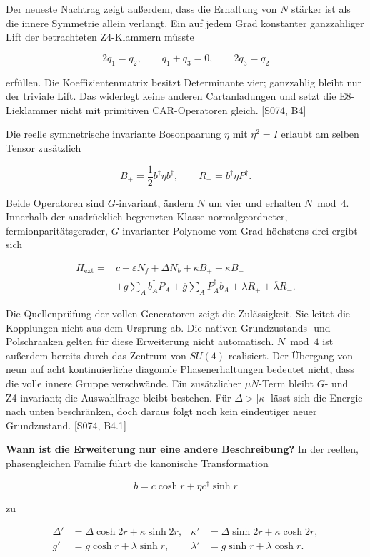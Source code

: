 Der neueste Nachtrag zeigt außerdem, dass die Erhaltung von \(N\)
stärker ist als die innere Symmetrie allein verlangt. Ein auf jedem Grad
konstanter ganzzahliger Lift der betrachteten Z4-Klammern müsste

\[2q_1=q_2,\qquad q_1+q_3=0,\qquad2q_3=q_2\]

erfüllen. Die Koeffizientenmatrix besitzt Determinante vier; ganzzahlig
bleibt nur der triviale Lift. Das widerlegt keine anderen Cartanladungen
und setzt die E8-Lieklammer nicht mit primitiven CAR-Operatoren gleich.
{[}S074, B4{]}

Die reelle symmetrische invariante Bosonpaarung \(\eta\) mit
\(\eta^2=I\) erlaubt am selben Tensor zusätzlich

\[B_+=\frac12b^\dagger\eta b^\dagger,\qquad
R_+=b^\dagger\eta P^\dagger.\]

Beide Operatoren sind \(G\)-invariant, ändern \(N\) um vier und erhalten
\(N\bmod4\). Innerhalb der ausdrücklich begrenzten Klasse
normalgeordneter, fermionparitätsgerader, \(G\)-invarianter Polynome vom
Grad höchstens drei ergibt sich

\[\begin{aligned}
H_{\mathrm{ext}}={}&c+\varepsilon N_f+\Delta N_b
+\kappa B_++\overline\kappa B_-\\
&+g\sum_A b_A^\dagger P_A
+\overline g\sum_A P_A^\dagger b_A
+\lambda R_++\overline\lambda R_-.
\end{aligned}\]

Die Quellenprüfung der vollen Generatoren zeigt die Zulässigkeit. Sie
leitet die Kopplungen nicht aus dem Ursprung ab. Die nativen
Grundzustands- und Polschranken gelten für diese Erweiterung nicht
automatisch. \(N\bmod4\) ist außerdem bereits durch das Zentrum von
\(SU(4)\) realisiert. Der Übergang von neun auf acht kontinuierliche
diagonale Phasenerhaltungen bedeutet nicht, dass die volle innere Gruppe
verschwände. Ein zusätzlicher \(\mu N\)-Term bleibt \(G\)- und
Z4-invariant; die Auswahlfrage bleibt bestehen. Für \(\Delta>|\kappa|\)
lässt sich die Energie nach unten beschränken, doch daraus folgt noch
kein eindeutiger neuer Grundzustand. {[}S074, B4.1{]}

\textbf{Wann ist die Erweiterung nur eine andere Beschreibung?} In der
reellen, phasengleichen Familie führt die kanonische Transformation

\[b=c\cosh r+\eta c^\dagger\sinh r\]

zu

\[\begin{aligned}
\Delta'&=\Delta\cosh2r+\kappa\sinh2r,&
\kappa'&=\Delta\sinh2r+\kappa\cosh2r,\\
g'&=g\cosh r+\lambda\sinh r,&
\lambda'&=g\sinh r+\lambda\cosh r.
\end{aligned}\]

